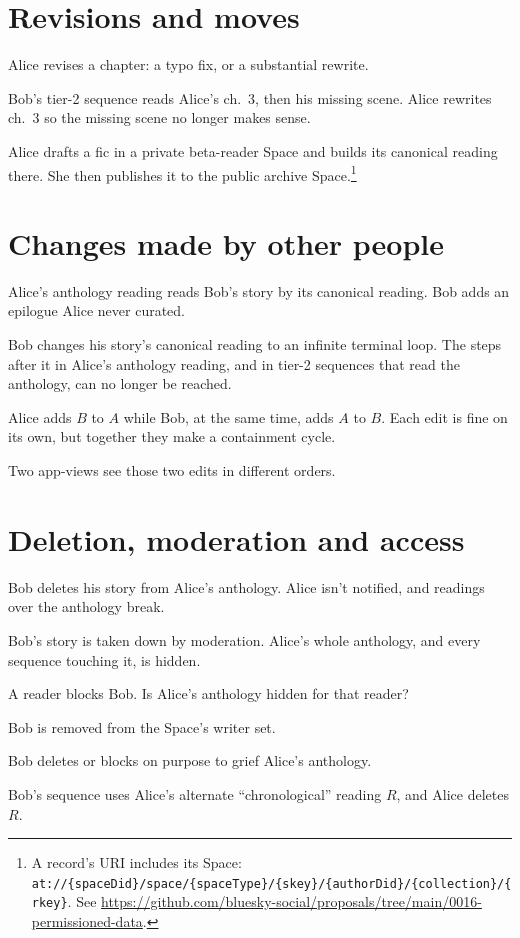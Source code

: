 \documentclass{amsart}
\begin{document}
\section{Revisions and moves}
\begin{todo}
\item Alice revises a chapter: a typo fix, or a substantial rewrite.
\item Bob's tier-2 sequence reads Alice's ch.~3, then his missing scene. Alice rewrites ch.~3 so the missing scene no longer makes sense.
\item Alice drafts a fic in a private beta-reader Space and builds its canonical reading there. She then publishes it to the public archive Space.\footnote{A record's URI includes its Space: \nolinkurl{at://{spaceDid}/space/{spaceType}/{skey}/{authorDid}/{collection}/{rkey}}. See \url{https://github.com/bluesky-social/proposals/tree/main/0016-permissioned-data}.}
\end{todo}

\section{Changes made by other people}
\begin{todo}
\item Alice's anthology reading reads Bob's story by its canonical reading. Bob adds an epilogue Alice never curated.
\item Bob changes his story's canonical reading to an infinite terminal loop. The steps after it in Alice's anthology reading, and in tier-2 sequences that read the anthology, can no longer be reached.
\item Alice adds $B$ to $A$ while Bob, at the same time, adds $A$ to $B$. Each edit is fine on its own, but together they make a containment cycle.
\item Two app-views see those two edits in different orders.
\end{todo}

\section{Deletion, moderation and access}
\begin{todo}
\item Bob deletes his story from Alice's anthology. Alice isn't notified, and readings over the anthology break.
\item Bob's story is taken down by moderation. Alice's whole anthology, and every sequence touching it, is hidden.
\item A reader blocks Bob. Is Alice's anthology hidden for that reader?
\item Bob is removed from the Space's writer set.
\item Bob deletes or blocks on purpose to grief Alice's anthology.
\item Bob's sequence uses Alice's alternate ``chronological'' reading $R$, and Alice deletes $R$.
\end{todo}
\end{document}
